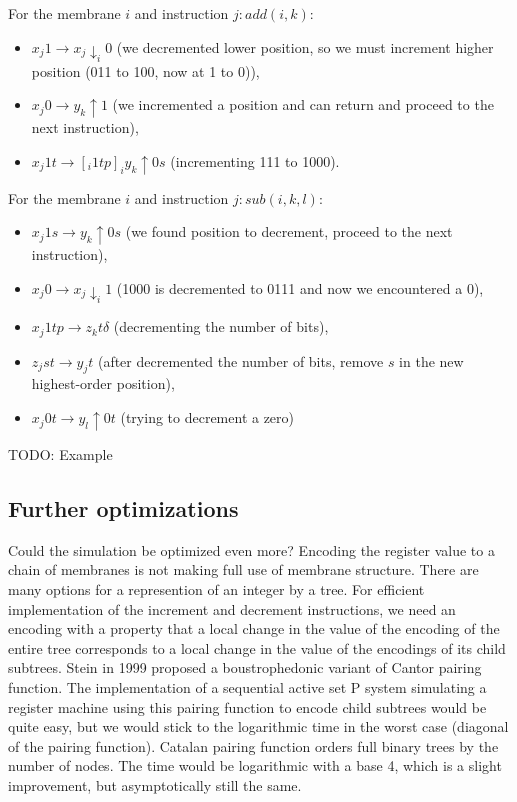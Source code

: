 \documentclass[llncs,submission,copyright,creativecommons]{../lib/lncs/llncs}
\begin{document}
For the membrane $i$ and instruction $j: add(i,k)$:
\begin{itemize}
  \item $x_j1 \rightarrow x_j\downarrow_{i}0$ (we decremented lower position, so we must increment higher position (011 to 100, now at 1 to 0)),
  \item $x_j0 \rightarrow y_k \uparrow 1$ (we incremented a position and can return and proceed to the next instruction),
  \item $x_j1t \rightarrow [_i 1tp]_iy_k\uparrow 0s$ (incrementing 111 to 1000).
\end{itemize}

For the membrane $i$ and instruction $j: sub(i,k,l)$:
\begin{itemize}
  \item $x_j1s \rightarrow y_k \uparrow 0s$ (we found position to decrement, proceed to the next instruction),
  \item $x_j0 \rightarrow x_j\downarrow_i 1$ (1000 is decremented to 0111 and now we encountered a 0),
  \item $x_j1tp \rightarrow z_kt \delta$ (decrementing the number of bits),
  \item $z_jst \rightarrow y_jt$ (after decremented the number of bits, remove $s$ in the new highest-order position),
  \item $x_j0t \rightarrow y_l \uparrow 0t$ (trying to decrement a zero)
\end{itemize}

TODO: Example

\subsection{Further optimizations} %
\label{sub:further_optimizations}

Could the simulation be optimized even more? Encoding the register value to a chain of membranes is not making full use of membrane structure. There are many options for a represention of an integer by a tree. For efficient implementation of the increment and decrement instructions, we need an encoding with a property that a local change in the value of the encoding of the entire tree corresponds to a local change in the value of the encodings of its child subtrees. Stein in 1999 \cite{Stein99Plowing} proposed a boustrophedonic variant of Cantor pairing function. The implementation of a sequential active set P system simulating a register machine using this pairing function to encode child subtrees would be quite easy, but we would stick to the logarithmic time in the worst case (diagonal of the pairing function).
Catalan pairing function \cite{Stanley1986EnumerativeCombinatorics} orders full binary trees by the number of nodes. The time would be logarithmic with a base 4, which is a slight improvement, but asymptotically still the same.
\end{document}
